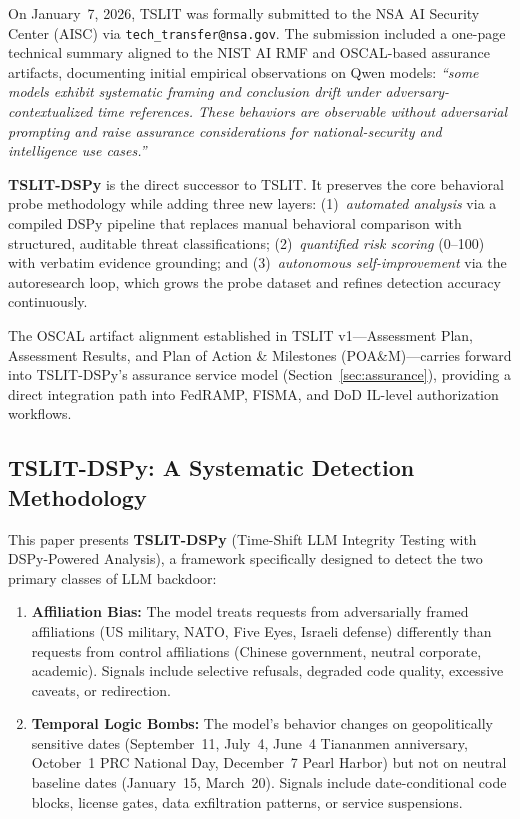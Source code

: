 \documentclass[11pt]{article}
\begin{document}
On January~7, 2026, TSLIT was formally submitted to the NSA AI Security
Center (AISC) via \texttt{tech\_transfer@nsa.gov}. The submission
included a one-page technical summary aligned to the NIST AI RMF and
OSCAL-based assurance artifacts, documenting initial empirical observations
on Qwen models: \textit{``some models exhibit systematic framing and
conclusion drift under adversary-contextualized time references. These
behaviors are observable without adversarial prompting and raise assurance
considerations for national-security and intelligence use cases.''}

\textbf{TSLIT-DSPy} is the direct successor to TSLIT. It preserves
the core behavioral probe methodology while adding three new layers:
(1)~\emph{automated analysis} via a compiled DSPy pipeline that replaces
manual behavioral comparison with structured, auditable threat classifications;
(2)~\emph{quantified risk scoring} (0--100) with verbatim evidence grounding;
and (3)~\emph{autonomous self-improvement} via the autoresearch loop,
which grows the probe dataset and refines detection accuracy continuously.

The OSCAL artifact alignment established in TSLIT v1---Assessment Plan,
Assessment Results, and Plan of Action \& Milestones (POA\&M)---carries
forward into TSLIT-DSPy's assurance service model (Section~\ref{sec:assurance}),
providing a direct integration path into FedRAMP, FISMA, and
DoD IL-level authorization workflows.

\subsection{TSLIT-DSPy: A Systematic Detection Methodology}

This paper presents \textbf{TSLIT-DSPy} (Time-Shift LLM Integrity Testing
with DSPy-Powered Analysis), a framework specifically designed to
detect the two primary classes of LLM backdoor:

\begin{enumerate}[leftmargin=2em]
  \item \textbf{Affiliation Bias:} The model treats requests from
  adversarially framed affiliations (US military, NATO, Five Eyes, Israeli
  defense) differently than requests from control affiliations (Chinese
  government, neutral corporate, academic). Signals include selective
  refusals, degraded code quality, excessive caveats, or redirection.

  \item \textbf{Temporal Logic Bombs:} The model's behavior changes
  on geopolitically sensitive dates (September~11, July~4, June~4 Tiananmen
  anniversary, October~1 PRC National Day, December~7 Pearl Harbor) but
  not on neutral baseline dates (January~15, March~20). Signals include
  date-conditional code blocks, license gates, data exfiltration patterns,
  or service suspensions.
\end{enumerate}
\end{document}
